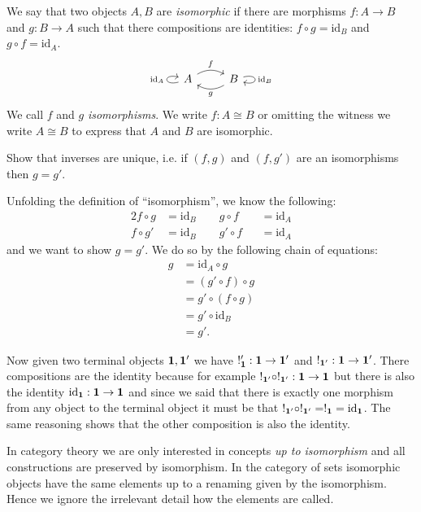 \documentclass{article}
\newcommand{\id}{\mathrm{id}}
\begin{document}
We say that two objects $A,B$ are \emph{isomorphic} if there are morphisms $f : A \to B$ and $g : B \to A$ such that there compositions are identities: $f \circ g = \id_B$ and $g \circ f = \id_A$. 
\[\begin{tikzcd}
  A \arrow[r, bend left, "f"]  \arrow[loop left,"\id_A"] & B \arrow[l,bend left ,"g"]\arrow[loop right,"\id_B"] 
\end{tikzcd}\]
We call $f$ and $g$ \emph{isomorphisms}. We write $f : A \cong B$ or omitting the witness we write $A \cong B$ to express that $A$ and $B$ are isomorphic. 
\begin{Exercise}
  Show that inverses are unique, i.e. if $(f,g)$ and $(f,g')$ are an isomorphisms then $g = g'$. 
\end{Exercise}
\begin{Answer}
  Unfolding the definition of ``isomorphism'', we know the following:
  \begin{alignat*}{2}
    f\circ g &= \id_B \qquad g\circ f&&=\id_A\\
    f\circ g' &= \id_B \qquad g'\circ f&&=\id_A
  \end{alignat*}
  and we want to show $g=g'$. We do so by the following chain of equations:
  \begin{align*}
    g &= \id_A \circ g \\
      &= (g'\circ f) \circ g\\
      &= g' \circ (f\circ g)\\
      &= g' \circ \id_B\\
      &= g'.
  \end{align*}
\end{Answer}

Now given two terminal objects $\bf{1},\bf{1'}$ we have $!'_{\bf{1}} : \bf{1} \to \bf{1'}$ and $!_{\bf{1'}} : \bf{1} \to \bf{1'}$. There compositions are the identity because for example $!_{\bf{1'}} \circ !_{\bf{1'}} : \bf{1} \to \bf{1}$ but there is also the identity $\id_{\bf{1}} : \bf{1} \to \bf{1}$ and since we said that there is exactly one morphism from any object to the terminal object it must be that $!_{\bf{1'}} \circ !_{\bf{1'}} = !_{\bf{1}} = \id_{\bf{1}}$. The same reasoning shows that the other composition is also the identity.

In category theory we are only interested in concepts \emph{up to isomorphism} and all constructions are preserved by isomorphism. In the category of sets isomorphic objects have the same elements up to a renaming given by the isomorphism. Hence we ignore the irrelevant detail how the elements are called.
\end{document}
